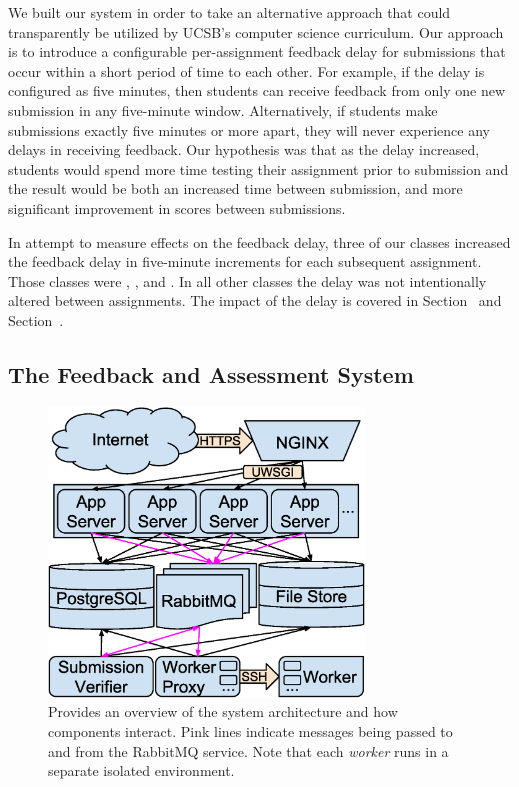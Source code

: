 We built our system in order to take an alternative approach that could
transparently be utilized by UCSB's computer science curriculum. Our approach
is to introduce a configurable per-assignment feedback delay for submissions
that occur within a short period of time to each other. For example, if the
delay is configured as five minutes, then students can receive feedback from
only one new submission in any five-minute window. Alternatively, if students
make submissions exactly five minutes or more apart, they will never experience
any delays in receiving feedback. Our hypothesis was that as the delay
increased, students would spend more time testing their assignment prior to
submission and the result would be both an increased time between submission,
and more significant improvement in scores between submissions.

In attempt to measure effects on the feedback delay, three of our classes
increased the feedback delay in five-minute increments for each subsequent
assignment. Those classes were , , and . In
all other classes the delay was not intentionally altered between
assignments. The impact of the delay is covered in
Section~ and Section~.


\subsection{The Feedback and Assessment System}

\begin{figure}[!t]
\centering \includegraphics[width=3.3in]{graphs/architecture.eps}
\caption{Provides an overview of the system architecture and how components
  interact. Pink lines indicate messages being passed to and from the RabbitMQ
  service. Note that each \emph{worker} runs in a separate isolated
  environment.}
\end{figure}

